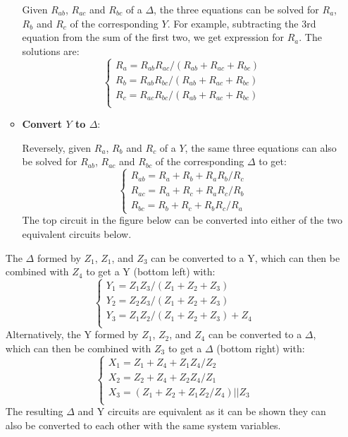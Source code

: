 \begin{itemize}
\begin{itemize}
    Given $R_{ab}$, $R_{ac}$ and $R_{bc}$ of a $\Delta$, the three equations 
    can be solved for $R_a$, $R_b$ and $R_c$ of the corresponding $Y$. For 
    example, subtracting the 3rd equation from the sum of the first two, we 
    get expression for $R_a$. The solutions are:
    \[ \left\{ \begin{array}{rr}
      R_a=R_{ab}R_{ac}/(R_{ab}+R_{ac}+R_{bc}) \\
      R_b=R_{ab}R_{bc}/(R_{ab}+R_{ac}+R_{bc}) \\
      R_c=R_{ac}R_{bc}/(R_{ab}+R_{ac}+R_{bc}) \\
    \end{array} \right. \]

  \item {\bf Convert $Y$ to $\Delta$}: 

    Reversely, given $R_a$, $R_b$ and $R_c$ of a $Y$, the same three 
    equations can also be solved for $R_{ab}$, $R_{ac}$ and $R_{bc}$ of
    the corresponding $\Delta$ to get:
    \[ \left\{ \begin{array}{rr}
      R_{ab}=R_a+R_b+R_aR_b/R_c	\\
      R_{ac}=R_a+R_c+R_aR_c/R_b	\\
      R_{bc}=R_b+R_c+R_bR_c/R_a	\end{array} \right. \]
    The top circuit in the figure below can be converted into either of 
    the two equivalent circuits below.
\end{itemize}


The $\Delta$ formed by $Z_1$, $Z_1$, and $Z_3$ can
be converted to a Y, which can then be combined with $Z_4$ to get 
a Y (bottom left) with:
\[ \left\{ \begin{array}{l}
  Y_1=Z_1Z_3/(Z_1+Z_2+Z_3) \\
  Y_2=Z_2Z_3/(Z_1+Z_2+Z_3) \\
  Y_3=Z_1Z_2/(Z_1+Z_2+Z_3)+Z_4 \\
\end{array} \right. \]
Alternatively, the Y formed by $Z_1$, $Z_2$, and $Z_4$ can
be converted to a $\Delta$, which can then be combined with $Z_3$ 
to get a $\Delta$ (bottom right) with:
\[ \left\{ \begin{array}{l}
  X_1=Z_1+Z_4+Z_1Z_4/Z_2 \\
  X_2=Z_2+Z_4+Z_2Z_4/Z_1 \\
  X_3=(Z_1+Z_2+Z_1Z_2/Z_4) || Z_3 \\
\end{array} \right. \]
The resulting $\Delta$ and Y circuits are equivalent as
it can be shown they can also be converted to each other with the
same system variables.


\end{itemize}
